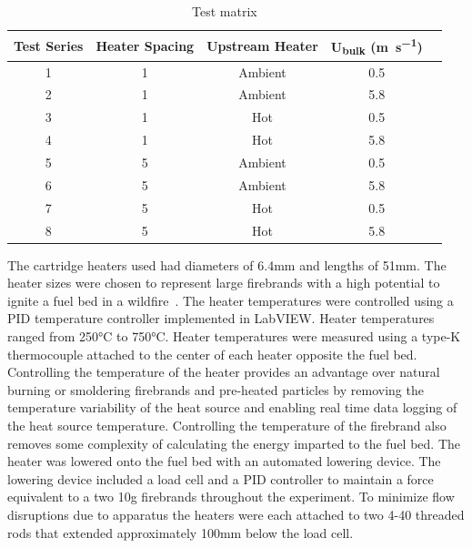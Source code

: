         \begin{table}[hpbt]
            \normalsize
            \caption{Test matrix}
            \centering
            \begin{tabular}{ccccr}
                \rowcolor{gray!50}
               Test Series & Heater Spacing & Upstream Heater & U\textsubscript{bulk} (\si{\meter\per\second})\\
                \hline
                1   & 1 & Ambient & 0.5 \\
                2   & 1 & Ambient & 5.8 \\
                3   & 1 & Hot     & 0.5 \\
                4   & 1 & Hot     & 5.8 \\
                5   & 5 & Ambient & 0.5 \\
                6   & 5 & Ambient & 5.8 \\
                7   & 5 & Hot     & 0.5 \\
                8   & 5 & Hot     & 5.8 \\
            \end{tabular}
            \label{tab:multiHeaterConfig}
        \end{table}
    
    The cartridge heaters used had diameters of 6.4\si{\milli\meter} and lengths of 51\si{\milli\meter}. The heater sizes were chosen to represent large firebrands with a high potential to ignite a fuel bed in a wildfire~\cite{Manzello2007}. The heater temperatures were controlled using a PID temperature controller implemented in LabVIEW. Heater temperatures ranged from 250\si{\celsius} to 750\si{\celsius}. Heater temperatures were measured using a type-K thermocouple attached to the center of each heater opposite the fuel bed.
    Controlling the temperature of the heater provides an advantage over natural burning or smoldering firebrands and pre-heated particles by removing the temperature variability of the heat source and enabling real time data logging of the heat source temperature. Controlling the temperature of the firebrand also removes some complexity of calculating the energy imparted to the fuel bed. The heater was lowered onto the fuel bed with an automated lowering device. The lowering device included a load cell and a PID controller to maintain a force equivalent to a two 10\si{\gram} firebrands throughout the experiment. To minimize flow disruptions due to apparatus the heaters were each attached to two 4-40 threaded rods that extended approximately 100\si{\milli\meter} below the load cell. 
    
